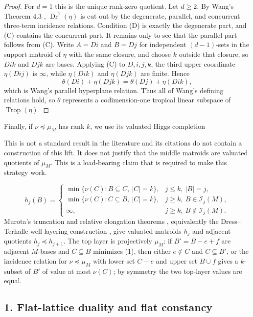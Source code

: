 \documentclass[12pt]{article}
\newcommand{\Dr}{\operatorname{Dr}}
\newcommand{\Trop}{\operatorname{Trop}}
\newcommand{\review}[1]{\begin{reviewbox}#1\end{reviewbox}}
\begin{document}
\begin{proof}
For $d=1$ this is the unique rank-zero quotient.  Let $d\ge2$.  By
Wang's Theorem 4.3 \cite{Wang}, $\Dr^1(\eta)$ is cut out by the
degenerate, parallel, and concurrent three-term incidence relations.
Condition (D) is exactly the degenerate part, and (C) contains the
concurrent part.  It remains only to see that the parallel part follows
from (C).  Write $A=Di$ and $B=Dj$ for independent $(d-1)$-sets in the
support matroid of $\eta$ with the same closure, and choose $k$ outside
that closure, so $Dik$ and $Djk$ are bases.  Applying (C) to
$D,i,j,k$, the third upper coordinate $\eta(Dij)$ is $\infty$, while
$\eta(Dik)$ and $\eta(Djk)$ are finite.  Hence
\[
        \theta(Di)+\eta(Djk)=\theta(Dj)+\eta(Dik),
\]
which is Wang's parallel hyperplane relation.  Thus all of Wang's
defining relations hold, so $\theta$ represents a codimension-one
tropical linear subspace of $\Trop(\eta)$.
\end{proof}

Finally, if $\nu\preceq\mu_M$ has rank $k$, we use its valuated Higgs
completion
\review{This is not a standard result in the literature and its citations do not contain a construction of this lift. It does not justify that the middle matroids are valuated quotients of $\mu_M$. This is a load-bearing claim that is required to make this strategy work.}
\[
 h_j(B)=
 \begin{cases}
 \min\{\nu(C): B\subseteq C,\ |C|=k\}, & j\le k,\ |B|=j,\\
 \min\{\nu(C): C\subseteq B,\ |C|=k\}, & j\ge k,\ B\in\mathcal I_j(M),\\
 \infty, & j\ge k,\ B\notin\mathcal I_j(M).
 \end{cases}                                                \tag{1}
\]
Murota's truncation and relative elongation theorems \cite[Theorems 2.1 and 4.1]{Murota}, equivalently the
Dress--Terhalle well-layering construction \cite{DT}, give valuated matroids
$h_j$ and adjacent quotients $h_j\preceq h_{j+1}$.  The top layer is
projectively $\mu_M$: if $B'=B-e+f$ are adjacent $M$-bases and
$C\subseteq B$ minimizes (1), then either $e\notin C$ and $C\subseteq B'$,
or the incidence relation for $\nu\preceq\mu_M$ with lower set $C-e$ and
upper set $B\cup f$ gives a $k$-subset of $B'$ of value at most
$\nu(C)$; by symmetry the two top-layer values are equal.

\subsection*{1. Flat-lattice duality and flat constancy}
\end{document}

